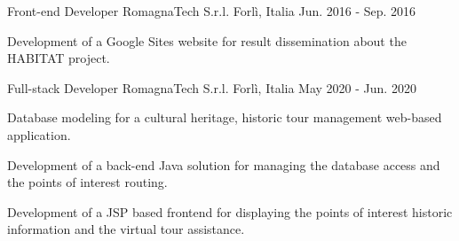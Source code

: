 

\begin{cventries}

  \cventry
    {Front-end Developer} %
    {RomagnaTech S.r.l.} %
    {Forlì, Italia} %
    {Jun. 2016 - Sep. 2016} %
    {
      \begin{cvitems} %
        \item {Development of a Google Sites website for result dissemination about the HABITAT project.}
      \end{cvitems}
    }

  \cventry
    {Full-stack Developer} %
    {RomagnaTech S.r.l.} %
    {Forlì, Italia} %
    {May 2020 - Jun. 2020} %
    {
      \begin{cvitems} %
        \item {Database modeling for a cultural heritage, historic tour management web-based application.}
        \item {Development of a back-end Java solution for managing the database access and the points of interest routing.}
        \item {Development of a JSP based frontend for displaying the points of interest historic information and the virtual tour assistance.}
      \end{cvitems}
    }

\end{cventries}
